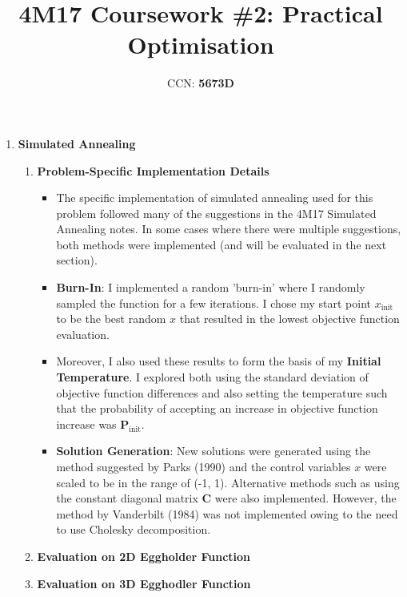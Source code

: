 \documentclass[12pt]{article}
\title{4M17 Coursework \#2: Practical Optimisation}
\author{CCN: \textbf{5673D}}
\begin{document}
\maketitle

\begin{enumerate}
	\item \textbf{Simulated Annealing}
	\begin{enumerate}
	\item \textbf{Problem-Specific Implementation Details}
	\begin{itemize}
		\item The specific implementation of simulated annealing used for this problem followed many of the suggestions in the 4M17 Simulated Annealing notes. In some cases where there were multiple suggestions, both methods were implemented (and will be evaluated in the next section).
		\item \textbf{Burn-In}: I implemented a random 'burn-in' where I randomly sampled the function for a few iterations. I chose my start point $x_{\text{init}}$ to be the best random $x$ that resulted in the lowest objective function evaluation. 
		\item Moreover, I also used these results to form the basis of my \textbf{Initial Temperature}. I explored both using the standard deviation of objective function differences and also setting the temperature such that the probability of accepting an increase in objective function increase was $\bm{P}_{\text{init}}$.
		\item \textbf{Solution Generation}: New solutions were generated using the method suggested by Parks (1990) and the control variables $x$ were scaled to be in the range of (-1, 1). Alternative methods such as using the constant diagonal matrix $\bm{C}$ were also implemented. However, the method by Vanderbilt (1984) was not implemented owing to the need to use Cholesky decomposition.
	\end{itemize}
	\item \textbf{Evaluation on 2D Eggholder Function}
	\item \textbf{Evaluation on 3D Egghodler Function}
	\end{enumerate}
\end{enumerate}
\end{document}
